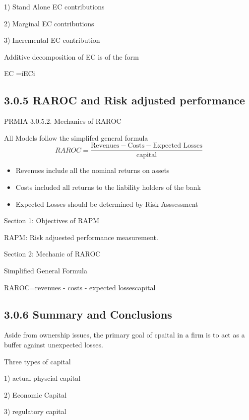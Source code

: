 1) Stand Alone EC contributions

2) Marginal EC contributions

3) Incremental EC contribution


Additive decomposition of EC is of the form

    EC =iECi



\subsection{3.0.5 RAROC and Risk adjusted performance}


PRMIA 3.0.5.2.
Mechanics of RAROC

All Models follow the simplifed general formula
\[
RAROC = \frac{\mbox{Revenues} - \mbox{Costs} - \mbox{Expected Losses} }{\mbox{capital}}
\]

\begin{itemize}
\item Revenues include all the nominal returns on assets
\item Costs included all returns to the liability holders of the bank
\item Expected Losses should be determined by Risk Asssessment
\end{itemize}


Section 1: Objectives of RAPM


RAPM: Risk adjuested performance measurement.


Section 2:  Mechanic of RAROC


Simplified General Formula


RAROC=revenues - costs - expected lossescapital

\subsection{3.0.6 Summary and Conclusions}


Aside from ownership issues, the primary goal of cpaital in a firm is to act as a buffer against unexpected losses.


Three types of capital

1) actual physcial capital

2) Economic Capital

3) regulatory capital
